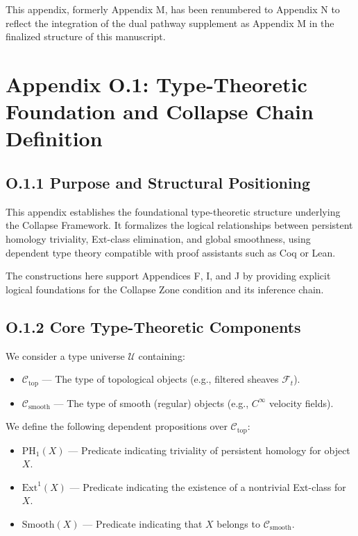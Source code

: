 \documentclass[11pt]{article}
\begin{document}
This appendix, formerly Appendix M, has been renumbered to Appendix N to reflect the integration of the dual pathway supplement as Appendix M in the finalized structure of this manuscript.




\section*{Appendix O.1: Type-Theoretic Foundation and Collapse Chain Definition}

\subsection*{O.1.1 Purpose and Structural Positioning}

This appendix establishes the foundational type-theoretic structure underlying the Collapse Framework.  
It formalizes the logical relationships between persistent homology triviality, Ext-class elimination, and global smoothness, using dependent type theory compatible with proof assistants such as Coq or Lean.

The constructions here support Appendices F, I, and J by providing explicit logical foundations for the Collapse Zone condition and its inference chain.

\subsection*{O.1.2 Core Type-Theoretic Components}

We consider a type universe \( \mathcal{U} \) containing:

\begin{itemize}
  \item \( \mathcal{C}_{\mathrm{top}} \) — The type of topological objects (e.g., filtered sheaves \( \mathcal{F}_t \)).
  \item \( \mathcal{C}_{\mathrm{smooth}} \) — The type of smooth (regular) objects (e.g., \( C^\infty \) velocity fields).
\end{itemize}

We define the following dependent propositions over \( \mathcal{C}_{\mathrm{top}} \):

\begin{itemize}
  \item \( \mathrm{PH}_1(X) \) — Predicate indicating triviality of persistent homology for object \( X \).
  \item \( \mathrm{Ext}^1(X) \) — Predicate indicating the existence of a nontrivial Ext-class for \( X \).
  \item \( \mathrm{Smooth}(X) \) — Predicate indicating that \( X \) belongs to \( \mathcal{C}_{\mathrm{smooth}} \).
\end{itemize}
\end{document}
